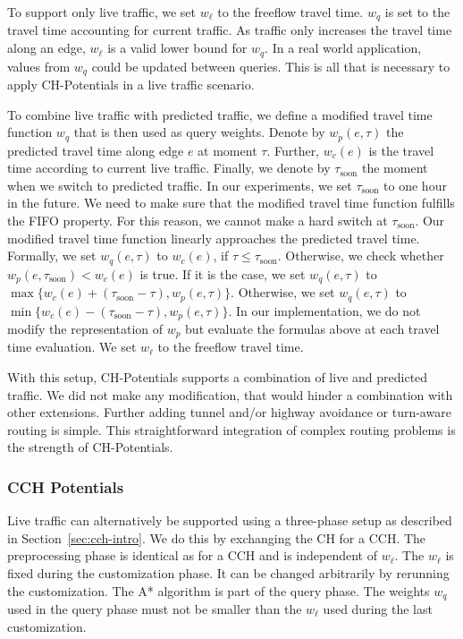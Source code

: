 \documentclass[manuscript,review]{acmart}
\begin{document}
To support only live traffic, we set $w_\ell$ to the freeflow travel time.
$w_q$ is set to the travel time accounting for current traffic.
As traffic only increases the travel time along an edge, $w_\ell$ is a valid lower bound for $w_q$.
In a real world application, values from $w_q$ could be updated between queries.
This is all that is necessary to apply CH-Potentials in a live traffic scenario.

To combine live traffic with predicted traffic, we define a modified travel time function $w_q$ that is then used as query weights.
Denote by $w_p(e,\tau)$ the predicted travel time along edge $e$ at moment $\tau$.
Further, $w_c(e)$ is the travel time according to current live traffic.
Finally, we denote by $\tau_{\mathrm{soon}}$ the moment when we switch to predicted traffic.
In our experiments, we set $\tau_{\mathrm{soon}}$ to one hour in the future.
We need to make sure that the modified travel time function fulfills the FIFO property.
For this reason, we cannot make a hard switch at $\tau_{\mathrm{soon}}$.
Our modified travel time function linearly approaches the predicted travel time. %
%
Formally, we set $w_q(e,\tau)$ to $w_c(e)$, if $\tau \leq \tau_{\mathrm{soon}}$.
Otherwise, we check whether $w_p(e,\tau_{\mathrm{soon}}) < w_c(e)$ is true.
If it is the case, we set $w_q(e,\tau)$ to $\max\{w_c(e)+(\tau_{\mathrm{soon}}-\tau), w_p(e,\tau)\}$.
Otherwise, we set $w_q(e,\tau)$ to $\min\{w_c(e)-(\tau_{\mathrm{soon}}-\tau), w_p(e,\tau)\}$.
In our implementation, we do not modify the representation of $w_p$ but evaluate the formulas above at each travel time evaluation.
We set $w_\ell$ to the freeflow travel time.

With this setup, CH-Potentials supports a combination of live and predicted traffic.
We did not make any modification, that would hinder a combination with other extensions.
Further adding tunnel and/or highway avoidance or turn-aware routing is simple.
This straightforward integration of complex routing problems is the strength of CH-Potentials.

\subsubsection{CCH Potentials}

Live traffic can alternatively be supported using a three-phase setup as described in Section~\ref{sec:cch-intro}.
We do this by exchanging the CH for a CCH.
The preprocessing phase is identical as for a CCH and is independent of $w_\ell$.
The $w_\ell$ is fixed during the customization phase.
It can be changed arbitrarily by rerunning the customization.
The A* algorithm is part of the query phase.
The weights $w_q$ used in the query phase must not be smaller than the $w_\ell$ used during the last customization.
\end{document}
